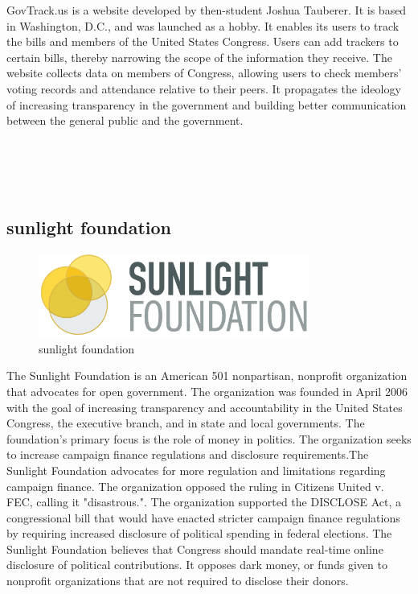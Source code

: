 \documentclass[conference]{IEEEtran}
\begin{document}
GovTrack.us is a website developed by then-student Joshua Tauberer. It is based in Washington, D.C., and was launched as a hobby. It enables its users to track the bills and members of the United States Congress. Users can add trackers to certain bills, thereby narrowing the scope of the information they receive. The website collects data on members of Congress, allowing users to check members' voting records and attendance relative to their peers. It propagates the ideology of increasing transparency in the government and building better communication between the general public and the government.
\\
\\
\\
\\
\\

\subsection{sunlight foundation}
  \begin{figure}[htbp]
	\centerline{\includegraphics[width=89mm, scale=0.5]{fig/sunlight_foundation.png}}
	\caption{sunlight foundation}
	\label{fig}
	\end{figure}
The Sunlight Foundation is an American 501 nonpartisan, nonprofit organization that advocates for open government. The organization was founded in April 2006 with the goal of increasing transparency and accountability in the United States Congress, the executive branch, and in state and local governments. The foundation's primary focus is the role of money in politics. The organization seeks to increase campaign finance regulations and disclosure requirements.The Sunlight Foundation advocates for more regulation and limitations regarding campaign finance. The organization opposed the ruling in Citizens United v. FEC, calling it "disastrous.". The organization supported the DISCLOSE Act, a congressional bill that would have enacted stricter campaign finance regulations by requiring increased disclosure of political spending in federal elections. The Sunlight Foundation believes that Congress should mandate real-time online disclosure of political contributions. It opposes dark money, or funds given to nonprofit organizations that are not required to disclose their donors.
\\
\\
\\
\\
\\
\\
\\
\\
\end{document}
